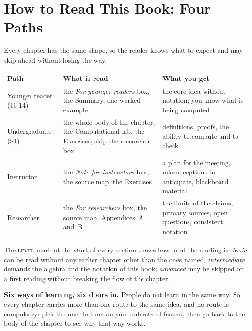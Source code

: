 \chapter*{How to Read This Book: Four Paths}

Every chapter has the same shape, so the reader knows what to expect and may skip ahead
without losing the way.

\begin{center}
\small
\begin{tabular}{@{}p{3.1cm}p{4.6cm}p{4.4cm}@{}}
\toprule
\textbf{Path} & \textbf{What is read} & \textbf{What you get} \\
\midrule
Younger reader (10-14) & the \emph{For younger readers} box, the Summary, one worked
  example & the core idea without notation; you know what is being computed \\
Undergraduate (S1) & the whole body of the chapter, the Computational lab, the Exercises;
  skip the researcher box & definitions, proofs, the ability to compute and to check \\
Instructor & the \emph{Note for instructors} box, the source map, the Exercises & a plan
  for the meeting, misconceptions to anticipate, blackboard material \\
Researcher & the \emph{For researchers} box, the source map, Appendices~A and~B & the
  limits of the claims, primary sources, open questions, consistent notation \\
\bottomrule
\end{tabular}
\end{center}

\medskip
The \textsc{level} mark at the start of every section shows how hard the reading is:
\emph{basic} can be read without any earlier chapter other than the ones named;
\emph{intermediate} demands the algebra and the notation of this book;
\emph{advanced} may be skipped on a first reading without breaking the flow of the
chapter.

\medskip
\noindent\textbf{Six ways of learning, six doors in.} People do not learn in the same
way. So every chapter carries more than one route to the same idea, and no route is
compulsory: pick the one that makes you understand fastest, then go back to the body of
the chapter to see why that way works.

